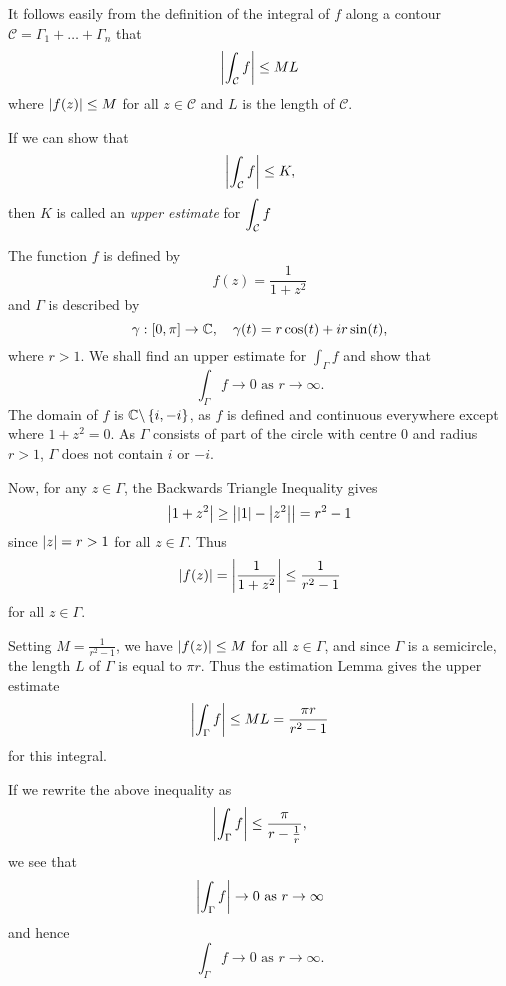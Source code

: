 It follows easily from the definition of the integral of $f$ along a contour $\mathcal{C}=\Gamma_1 + \ldots + \Gamma_n$ that 
\[
\left| \int_{\mathcal{C}} f \right| \leq M L
\]
where $\left| f(z) \right| \leq M$ for all $z \in \mathcal{C}$ and $L$ is the length of $\mathcal{C}$.
\begin{note}
If we can show that
\[
\left|  \int_{\mathcal{C}} f  \right| \leq K,
\]
then $K$ is called an \emph{upper estimate} for $\displaystyle \int_{\mathcal{C}} f$
\end{note}
\begin{example}
\label{e:estimation}
The function $f$ is defined by
\[
f(z) = \frac{1}{1+z^2}
\]
and $\Gamma$ is described by \[ \gamma:[0,\pi] \to \mathbb{C}, \quad \gamma(t) = r \cos (t) +i r \sin (t), \]
where $r>1$.  We shall find an upper estimate for $\int_{\Gamma} f$ and show that
\[
\int_{\Gamma} f \to 0 \text{ as } r \to \infty.
\]
The domain of $f$ is $\mathbb{C} \backslash \left\{i,-i\right\}$, as $f$ is defined and continuous everywhere except where $1+z^2=0$.  As $\Gamma$ consists of part of the circle with centre $0$ and radius $r>1$, $\Gamma$ does not contain $i$ or $-i$.

Now, for any $z \in \Gamma$, the Backwards Triangle Inequality gives
\[
\left| 1+z^2 \right| \geq \left| \left| 1 \right|-\left| z^2 \right| \right| = r^2-1
\]
since $\left| z \right|=r>1$ for all $z \in \Gamma$.  Thus
\[
\left| f(z) \right| = \left| \frac{1}{1+z^2} \right| \leq \frac{1}{r^2-1}
\]
for all $z \in \Gamma$.

Setting $M = \frac{1}{r^2-1}$, we have $\left| f(z) \right| \leq M$ for all $z \in \Gamma$, and since $\Gamma$ is a semicircle, the length $L$ of $\Gamma$ is equal to $\pi r$.  Thus the estimation Lemma gives the upper estimate
\[
\left|  \int_{\Gamma} f  \right| \leq ML = \frac{\pi r}{r^2-1}
\]
for this integral.

If we rewrite the above inequality as
\[
\left|  \int_{\Gamma} f  \right| \leq \frac{\pi}{r-\frac{1}{r}},
\]
we see that
\[
\left| \int_{\Gamma} f  \right| \to 0 \text{ as } r \to \infty
\]
and hence
\[
 \int_{\Gamma} f \to 0 \text{ as } r \to \infty.
\]

\end{example}
